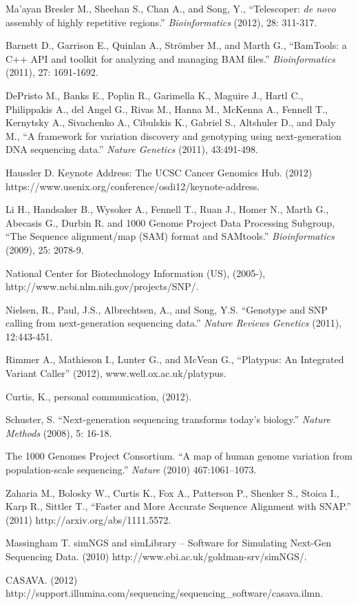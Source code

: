 \documentclass[12pt]{article}
\begin{document}
\newpage
\begin{thebibliography}{1}

 Ma'ayan Bresler M., Sheehan S., Chan A., and Song, Y., ``Telescoper: {\it de novo} assembly of highly repetitive regions.'' {\em Bioinformatics} (2012), 28: 311-317.

 Barnett D., Garrison E., Quinlan A., Str\"{o}mber M., and Marth G., ``BamTools: a C++ API and toolkit for analyzing and managing BAM files.'' {\em Bioinformatics} (2011), 27: 1691-1692.

 DePristo M., Banks E., Poplin R., Garimella K., Maguire J., Hartl C., Philippakis A., del Angel G., Rivas M., Hanna M., McKenna A., Fennell T., Kernytsky A., Sivachenko A., Cibulskis K., Gabriel S., Altshuler D., and Daly M., ``A framework for variation discovery and genotyping using next-generation DNA sequencing data.'' {\em Nature Genetics} (2011), 43:491-498.

 Haussler D. Keynote Address: The UCSC Cancer Genomics Hub. (2012) https://www.usenix.org/conference/osdi12/keynote-address.

 Li H., Handsaker B., Wysoker A., Fennell T., Ruan J., Homer N., Marth G., Abecasis G., Durbin R. and 1000 Genome Project Data Processing Subgroup, ``The Sequence alignment/map (SAM) format and SAMtools.'' {\em Bioinformatics} (2009), 25: 2078-9.

 National Center for Biotechnology Information (US), (2005-), http://www.ncbi.nlm.nih.gov/projects/SNP/.

 Nielsen, R., Paul, J.S., Albrechtsen, A., and Song, Y.S. ``Genotype and SNP calling from next-generation sequencing data.'' {\em Nature Reviews Genetics} (2011), 12:443-451. 

 Rimmer A., Mathieson I., Lunter G., and McVean G., ``Platypus: An Integrated Variant Caller'' (2012), www.well.ox.ac.uk/platypus.

 Curtis, K., personal communication, (2012).

 Schuster, S. ``Next-generation sequencing transforms today's biology.'' {\em Nature Methods} (2008), 5: 16-18.

 The 1000 Genomes Project Consortium. ``A map of human genome variation from population-scale sequencing.'' {\em Nature} (2010) 467:1061–1073.

 Zaharia M., Bolosky W., Curtis K., Fox A., Patterson P., Shenker S., Stoica I., Karp R., Sittler T., ``Faster and More Accurate Sequence Alignment with SNAP.'' (2011) http://arxiv.org/abs/1111.5572.

 Massingham T. simNGS and simLibrary -- Software for Simulating Next-Gen Sequencing Data. (2010) http://www.ebi.ac.uk/goldman-srv/simNGS/.

 CASAVA. (2012) http://support.illumina.com/sequencing/sequencing\_software/casava.ilmn.
\end{thebibliography}
\end{document}
